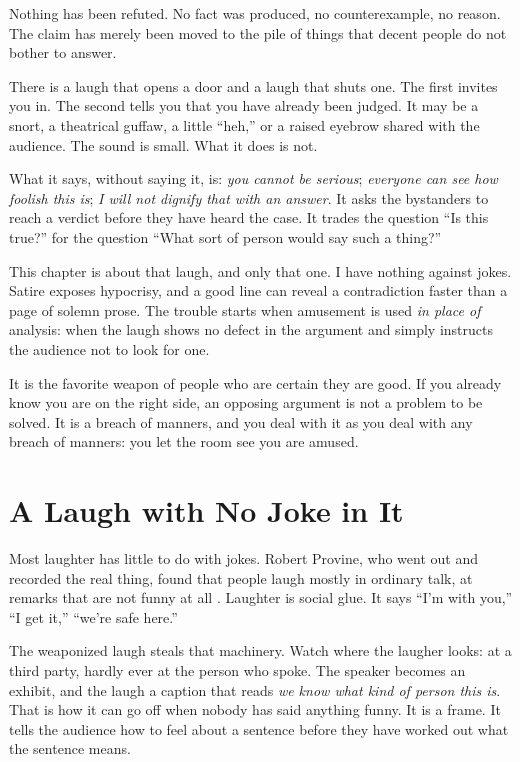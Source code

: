 \documentclass[12pt,a4paper]{book}
\begin{document}
Nothing has been refuted. No fact was produced, no counterexample, no reason. The claim has merely been moved to the pile of things that decent people do not bother to answer.

There is a laugh that opens a door and a laugh that shuts one. The first invites you in. The second tells you that you have already been judged. It may be a snort, a theatrical guffaw, a little ``heh,'' or a raised eyebrow shared with the audience. The sound is small. What it does is not.

What it says, without saying it, is: \emph{you cannot be serious}; \emph{everyone can see how foolish this is}; \emph{I will not dignify that with an answer}. It asks the bystanders to reach a verdict before they have heard the case. It trades the question ``Is this true?'' for the question ``What sort of person would say such a thing?''

This chapter is about that laugh, and only that one. I have nothing against jokes. Satire exposes hypocrisy, and a good line can reveal a contradiction faster than a page of solemn prose. The trouble starts when amusement is used \emph{in place of} analysis: when the laugh shows no defect in the argument and simply instructs the audience not to look for one.

It is the favorite weapon of people who are certain they are good. If you already know you are on the right side, an opposing argument is not a problem to be solved. It is a breach of manners, and you deal with it as you deal with any breach of manners: you let the room see you are amused.

\section{A Laugh with No Joke in It}

Most laughter has little to do with jokes. Robert Provine, who went out and recorded the real thing, found that people laugh mostly in ordinary talk, at remarks that are not funny at all \cite{provine2000}. Laughter is social glue. It says ``I'm with you,'' ``I get it,'' ``we're safe here.''

The weaponized laugh steals that machinery. Watch where the laugher looks: at a third party, hardly ever at the person who spoke. The speaker becomes an exhibit, and the laugh a caption that reads \emph{we know what kind of person this is}. That is how it can go off when nobody has said anything funny. It is a frame. It tells the audience how to feel about a sentence before they have worked out what the sentence means.
\end{document}
